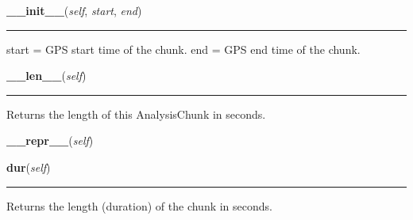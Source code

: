     \noindent\begin{boxedminipage}{\textwidth}

    \raggedright \textbf{\_\_init\_\_}(\textit{self}, \textit{start}, \textit{end})

    \vspace{-1.5ex}

    \rule{\textwidth}{0.5\fboxrule}
    start = GPS start time of the chunk. end = GPS end time of the chunk.

    \vspace{1ex}

    \end{boxedminipage}

    \label{pipeline:AnalysisChunk:__len__}
    \vspace{0.5ex}

    \noindent\begin{boxedminipage}{\textwidth}

    \raggedright \textbf{\_\_len\_\_}(\textit{self})

    \vspace{-1.5ex}

    \rule{\textwidth}{0.5\fboxrule}
    Returns the length of this AnalysisChunk in seconds.

    \vspace{1ex}

    \end{boxedminipage}
    
    \label{pipeline:AnalysisChunk:__repr__}
    \vspace{0.5ex}

    \noindent\begin{boxedminipage}{\textwidth}

    \raggedright \textbf{\_\_repr\_\_}(\textit{self})

    \end{boxedminipage}

    \label{pipeline:AnalysisChunk:dur}
    \vspace{0.5ex}

    \noindent\begin{boxedminipage}{\textwidth}

    \raggedright \textbf{dur}(\textit{self})

    \vspace{-1.5ex}

    \rule{\textwidth}{0.5\fboxrule}
    Returns the length (duration) of the chunk in seconds.

    \vspace{1ex}

    \end{boxedminipage}

